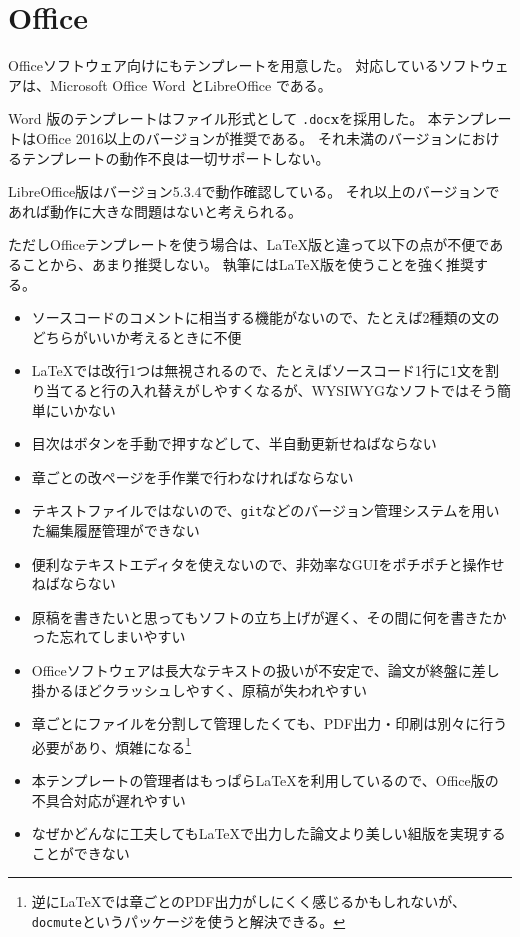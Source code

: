 	\section{Office}
		\label{sec:office}

		Officeソフトウェア向けにもテンプレートを用意した。
		対応しているソフトウェアは、Microsoft Office Word \textsuperscript{\textregistered} とLibreOffice  である。

		Word \textsuperscript{\textregistered} 版のテンプレートはファイル形式として \texttt{.doc}\textbf{x}を採用した。
		本テンプレートはOffice 2016以上のバージョンが推奨である。
		それ未満のバージョンにおけるテンプレートの動作不良は一切サポートしない。

		LibreOffice版はバージョン5.3.4で動作確認している。
		それ以上のバージョンであれば動作に大きな問題はないと考えられる。

		ただしOfficeテンプレートを使う場合は、\LaTeX{}版と違って以下の点が不便であることから、あまり推奨しない。
		執筆には\LaTeX{}版を使うことを強く推奨する。

		\begin{itemize}
			\item ソースコードのコメントに相当する機能がないので、たとえば2種類の文のどちらがいいか考えるときに不便
			\item \LaTeX{}では改行1つは無視されるので、たとえばソースコード1行に1文を割り当てると行の入れ替えがしやすくなるが、WYSIWYGなソフトではそう簡単にいかない
			\item 目次はボタンを手動で押すなどして、半自動更新せねばならない
			\item 章ごとの改ページを手作業で行わなければならない
			\item テキストファイルではないので、\texttt{git}などのバージョン管理システムを用いた編集履歴管理ができない
			\item 便利なテキストエディタを使えないので、非効率なGUIをポチポチと操作せねばならない
			\item 原稿を書きたいと思ってもソフトの立ち上げが遅く、その間に何を書きたかった忘れてしまいやすい
			\item Officeソフトウェアは長大なテキストの扱いが不安定で、論文が終盤に差し掛かるほどクラッシュしやすく、原稿が失われやすい
			\item 章ごとにファイルを分割して管理したくても、PDF出力・印刷は別々に行う必要があり、煩雑になる\footnote{逆に\LaTeX{}では章ごとのPDF出力がしにくく感じるかもしれないが、\texttt{docmute}というパッケージを使うと解決できる。}
			\item 本テンプレートの管理者はもっぱら\LaTeX{}を利用しているので、Office版の不具合対応が遅れやすい
			\item なぜかどんなに工夫しても\LaTeX{}で出力した論文より美しい組版を実現することができない
		\end{itemize}

